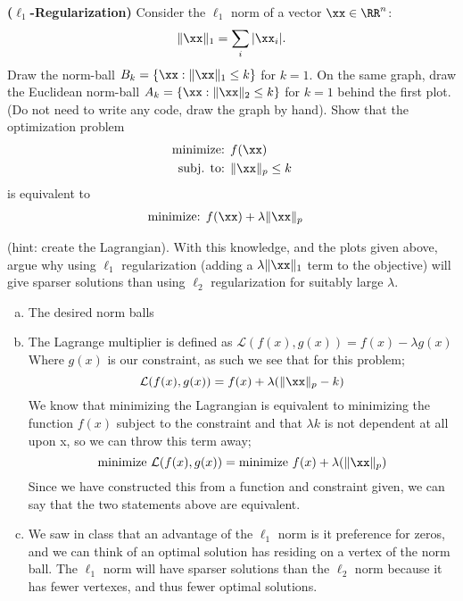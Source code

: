 \documentclass[12pt,letterpaper,fleqn]{hmcpset}
\begin{document}
\begin{problem}[2]
\textbf{($\ell_1$-Regularization)} Consider the $\ell_1$ norm of a vector $\xx\in\RR^n$:
\[
    \|\xx\|_1 = \sum_i |\xx_i|.
\]
Draw the norm-ball $B_k = \{\xx : \|\xx\|_1 \leq k\}$ for $k=1$. On the same graph, draw the Euclidean norm-ball $A_k = \{\xx : \|\xx\|_2 \leq k\}$ for $k=1$ behind the first plot. (Do not need to write any code, draw the graph by hand).
\newline
\newline
Show that the optimization problem
\begin{align*}
    \text{minimize: } & f(\xx)\\
    \text{subj. to: } & \|\xx\|_p \leq k
\end{align*}
is equivalent to
\begin{align*}
    \text{minimize: } & f(\xx) + \lambda\|\xx\|_p
\end{align*}

(hint: create the Lagrangian). With this knowledge, and the plots given above, argue why
using $\ell_1$ regularization (adding a $\lambda\|\xx\|_1$ term to the objective) will give
sparser solutions than using $\ell_2$ regularization for suitably large $\lambda$.
\end{problem}
\begin{solution}
\begin{enumerate}[(a)]
\item The desired norm balls
 \begin{center}
\end{center}
\item The Lagrange multiplier is defined as $\mathcal{L} (f(x), g(x)) = f(x)-\lambda g(x)$ Where $g(x)$ is our constraint, as such we see that for this problem; 
$$\mathcal{L} (f(x), g(x)) = f(x) + \lambda(\|\xx\|_p-k)$$
We know that minimizing the Lagrangian is equivalent to minimizing the function $f(x)$ subject to the constraint and that $\lambda k$ is not dependent at all upon x, so we can throw this term away; 
$$\text{minimize } \mathcal{L}(f(x), g(x)) = \text{minimize } f(x) + \lambda(\|\xx\|_p)$$
Since we have constructed this from a function and constraint given, we can say that the two statements above are equivalent. 
\item We saw in class that an advantage of the $\ell_1$ norm is it preference for zeros, and we can think of an optimal solution has residing on a vertex of the norm ball. The $\ell_1$ norm will have sparser solutions than the $\ell_2$ norm because it has fewer vertexes, and thus fewer optimal solutions.  
\end{enumerate}
\end{solution}
\newpage
\end{document}
